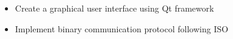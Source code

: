 \documentclass[10pt,a4paper,ragged2e,withhyper]{altacv}
\begin{document}
\begin{paracol}{2}
    



    



\begin{itemize}
\item Create a graphical user interface using Qt framework
\item Implement binary communication protocol following ISO
\end{itemize}


\end{paracol}
\end{document}
